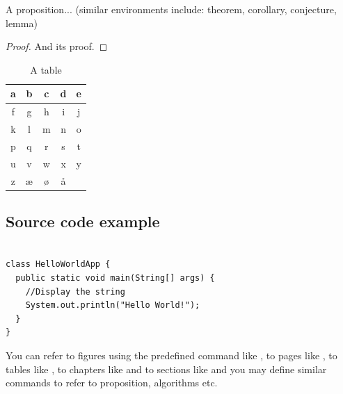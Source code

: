 \blindmathtrue
\blindtext

\begin{proposition}\label{def:a_proposition}
A proposition... (similar environments include: theorem, corollary, conjecture, lemma)

\end{proposition}

\begin{proof}
\vspace*{-1em} %
And its proof.
\end{proof}

\begin{table}
\caption{\label{tab:example}A table}
\centering
\begin{tabular}[b]{| c | c | c | c | c |}
\hline
a & b & c & d & e \\ \hline
f & g & h & i & j \\ \hline
k & l & m & n & o \\ \hline
p & q & r & s & t \\ \hline
u & v & w & x & y \\ \hline
z & æ & ø & å &   \\ \hline
\end{tabular} 
\end{table}

\subsection{Source code example}

\begin{algorithm}[h]
  \caption{The Hello World! program in Java.}
  \label{hello_world}
  \begin{verbatim}
  
class HelloWorldApp {
  public static void main(String[] args) {
    //Display the string
    System.out.println("Hello World!");
  }
}
\end{verbatim}
\end{algorithm}

You can refer to figures using the predefined command like , to pages like , to tables like , to chapters like  and to sections like  and you may define similar commands to refer to proposition, algorithms etc.
